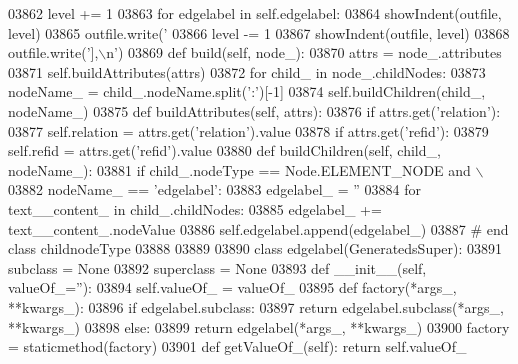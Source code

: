 \begin{DoxyCode}
{{{{{{{{{{{{{{{{{{{{{{{{{{{{{{{{{{{{{{{{{{{{{{{{{{{{{{{{{{{{{{{{{{{{{{{{{{{{{{{{{{{{{{{{{{{{{{{{{{{{{{{{{{{{{{{{{{{{{{{{{{{{{{{{{{{{{{{{{{{{{{{{{{{{{{{{{{{{{{{{{{{{{{{{{{{{{{{{{{{{{{{{{{{{{{{{{{{{{{{{{{{{{{{{{{{{{{{{{{{{{{{{{{{{{{{{{{{{{{{{{{{{{{{{{{03862         level += 1
03863         \textcolor{keywordflow}{for} edgelabel \textcolor{keywordflow}{in} self.edgelabel:
03864             showIndent(outfile, level)
03865             outfile.write(\textcolor{stringliteral}{'%
03866         level -= 1
03867         showIndent(outfile, level)
03868         outfile.write(\textcolor{stringliteral}{'],\(\backslash\)n'})
03869     \textcolor{keyword}{def }build(self, node\_):
03870         attrs = node\_.attributes
03871         self.buildAttributes(attrs)
03872         \textcolor{keywordflow}{for} child\_ \textcolor{keywordflow}{in} node\_.childNodes:
03873             nodeName\_ = child\_.nodeName.split(\textcolor{stringliteral}{':'})[-1]
03874             self.buildChildren(child\_, nodeName\_)
03875     \textcolor{keyword}{def }buildAttributes(self, attrs):
03876         \textcolor{keywordflow}{if} attrs.get(\textcolor{stringliteral}{'relation'}):
03877             self.relation = attrs.get(\textcolor{stringliteral}{'relation'}).value
03878         \textcolor{keywordflow}{if} attrs.get(\textcolor{stringliteral}{'refid'}):
03879             self.refid = attrs.get(\textcolor{stringliteral}{'refid'}).value
03880     \textcolor{keyword}{def }buildChildren(self, child\_, nodeName\_):
03881         \textcolor{keywordflow}{if} child\_.nodeType == Node.ELEMENT\_NODE \textcolor{keywordflow}{and} \(\backslash\)
03882             nodeName\_ == \textcolor{stringliteral}{'edgelabel'}:
03883             edgelabel\_ = \textcolor{stringliteral}{''}
03884             \textcolor{keywordflow}{for} text\_\_content\_ \textcolor{keywordflow}{in} child\_.childNodes:
03885                 edgelabel\_ += text\_\_content\_.nodeValue
03886             self.edgelabel.append(edgelabel\_)
03887 \textcolor{comment}{# end class childnodeType}
03888 
03889 
03890 \textcolor{keyword}{class }edgelabel(GeneratedsSuper):
03891     subclass = \textcolor{keywordtype}{None}
03892     superclass = \textcolor{keywordtype}{None}
03893     \textcolor{keyword}{def }__init__(self, valueOf\_=''):
03894         self.valueOf_ = valueOf\_
03895     \textcolor{keyword}{def }factory(*args\_, **kwargs\_):
03896         \textcolor{keywordflow}{if} edgelabel.subclass:
03897             \textcolor{keywordflow}{return} edgelabel.subclass(*args\_, **kwargs\_)
03898         \textcolor{keywordflow}{else}:
03899             \textcolor{keywordflow}{return} edgelabel(*args\_, **kwargs\_)
03900     factory = staticmethod(factory)
03901     \textcolor{keyword}{def }getValueOf_(self): \textcolor{keywordflow}{return} self.valueOf\_
}}}}}}}}}}}}}}}}}}}}}}}}}}}}}}}}}}}}}}}}}}}}}}}}}}}}}}}}}}}}}}}}}}}}}}}}}}}}}}}}}}}}}}}}}}}}}}}}}}}}}}}}}}}}}}}}}}}}}}}}}}}}}}}}}}}}}}}}}}}}}}}}}}}}}}}}}}}}}}}}}}}}}}}}}}}}}}}}}}}}}}}}}}}}}}}}}}}}}}}}}}}}}}}}}}}}}}}}}}}}}}}}}}}}}}}}}}}}}}}}}}}}}}}}}}}
\end{DoxyCode}
